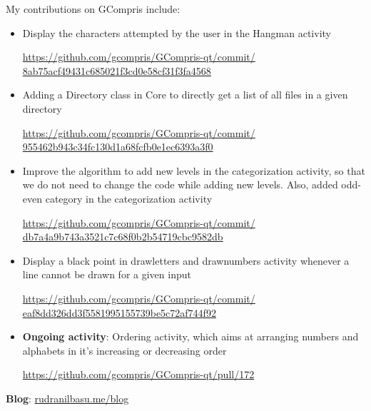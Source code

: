 \documentclass[preprint,12pt]{elsarticle}
\begin{document}
My contributions on GCompris include:

\begin{itemize}

\item Display the characters attempted by the user in the Hangman activity

\href{https://github.com/gcompris/GCompris-qt/commit/8ab75acf49431c685021f3cd0e58cf31f3fa4568}{https://github.com/gcompris/GCompris-qt/commit/\\8ab75acf49431c685021f3cd0e58cf31f3fa4568}

\item Adding a Directory class in Core to directly get a list of all files in a given directory

\href{https://github.com/gcompris/GCompris-qt/commit/955462b943c34fc130d1a68fcfb0e1ec6393a3f0}{https://github.com/gcompris/GCompris-qt/commit/\\955462b943c34fc130d1a68fcfb0e1ec6393a3f0}

\item Improve the algorithm to add new levels in the categorization activity, so that we do not need to change the code while adding new levels. Also, added odd-even category in the categorization activity

\href{https://github.com/gcompris/GCompris-qt/commit/db7a4a9b743a3521c7c68f0b2b54719cbc9582db}{https://github.com/gcompris/GCompris-qt/commit/\\db7a4a9b743a3521c7c68f0b2b54719cbc9582db}

\item Display a black point in drawletters and drawnumbers activity whenever a line cannot be drawn for a given input

\href{https://github.com/gcompris/GCompris-qt/commit/eaf8dd326dd3f5581995155739be5c72af744f92}{https://github.com/gcompris/GCompris-qt/commit/\\eaf8dd326dd3f5581995155739be5c72af744f92}

\item \textbf{Ongoing activity}: Ordering activity, which aims at arranging numbers and alphabets in it's increasing or decreasing order

\href{https://github.com/gcompris/GCompris-qt/pull/172}{https://github.com/gcompris/GCompris-qt/pull/172}

\end{itemize}


\textbf{Blog}: \href{http://rudranilbasu.me/blog/}{rudranilbasu.me/blog}
\end{document}
